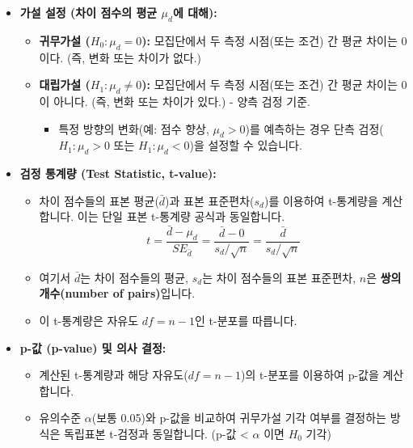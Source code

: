\documentclass[
  letterpaper,
]{book}
\providecommand{\tightlist}{%
  \setlength{\itemsep}{0pt}\setlength{\parskip}{0pt}}
\begin{document}
\begin{itemize}
\tightlist
\item
  \textbf{가설 설정 (차이 점수의 평균 \(\mu_d\)에 대해):}

  \begin{itemize}
  \tightlist
  \item
    \textbf{귀무가설 (\(H_0: \mu_d = 0\)):} 모집단에서 두 측정 시점(또는
    조건) 간 평균 차이는 0이다. (즉, 변화 또는 차이가 없다.)
  \item
    \textbf{대립가설 (\(H_1: \mu_d \neq 0\)):} 모집단에서 두 측정
    시점(또는 조건) 간 평균 차이는 0이 아니다. (즉, 변화 또는 차이가
    있다.) - 양측 검정 기준.

    \begin{itemize}
    \tightlist
    \item
      특정 방향의 변화(예: 점수 향상, \(\mu_d > 0\))를 예측하는 경우
      단측 검정(\(H_1: \mu_d > 0\) 또는 \(H_1: \mu_d < 0\))을 설정할 수
      있습니다.
    \end{itemize}
  \end{itemize}
\item
  \textbf{검정 통계량 (Test Statistic, t-value):}

  \begin{itemize}
  \tightlist
  \item
    차이 점수들의 표본 평균(\(\bar{d}\))과 표본 표준편차(\(s_d\))를
    이용하여 t-통계량을 계산합니다. 이는 단일 표본 t-통계량 공식과
    동일합니다.
    \[t = \frac{\bar{d} - \mu_d}{SE_{\bar{d}}} = \frac{\bar{d} - 0}{s_d / \sqrt{n}} = \frac{\bar{d}}{s_d / \sqrt{n}}\]
  \item
    여기서 \(\bar{d}\)는 차이 점수들의 평균, \(s_d\)는 차이 점수들의
    표본 표준편차, \(n\)은 \textbf{쌍의 개수(number of pairs)}입니다.
  \item
    이 t-통계량은 자유도 \(df = n - 1\)인 t-분포를 따릅니다.
  \end{itemize}
\item
  \textbf{p-값 (p-value) 및 의사 결정:}

  \begin{itemize}
  \tightlist
  \item
    계산된 t-통계량과 해당 자유도(\(df=n-1\))의 t-분포를 이용하여 p-값을
    계산합니다.
  \item
    유의수준 \(\alpha\)(보통 0.05)와 p-값을 비교하여 귀무가설 기각
    여부를 결정하는 방식은 독립표본 t-검정과 동일합니다. (p-값
    \textless{} \(\alpha\) 이면 \(H_0\) 기각)
  \end{itemize}
\end{itemize}
\end{document}
